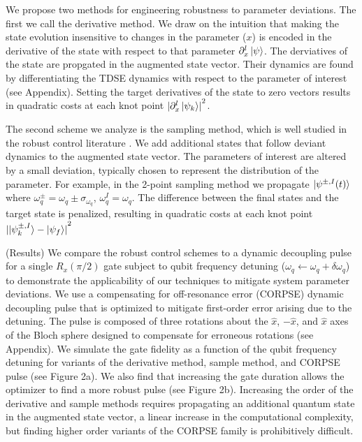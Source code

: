 \documentclass[
  amsfonts,
  amsmath,
  tbtags,
  amssymb,
  aps,
  nobibnotes,
  twocolumn,
]{revtex4-2}
\begin{document}
We propose two methods for engineering robustness
to parameter deviations. The first we call the
derivative method. We draw on the intuition that
making the state evolution insensitive to changes
in the parameter ($x$) is encoded in the derivative of
the state with respect to that parameter
$\partial_{x}^{l} \ket{\psi}$.
The derviatives of the state are propgated in the
augmented state vector. Their dynamics are found by differentiating
the TDSE dynamics with respect to the parameter of interest
(see Appendix). Setting the target derivatives of the state
to zero vectors results in quadratic costs at each
knot point
${\lvert \partial_{x}^{l} \ket{\psi_{k}} \rvert}^{2}$.

The second scheme we analyze is the sampling method,
which is well studied in the robust control literature
\cite{manchester2016derivative} \cite{tronarp2016sigma}.
We add additional
states that follow deviant dynamics to the augmented
state vector. The parameters of interest
are altered by a small deviation, typically chosen
to represent the distribution of the parameter.
For example, in the 2-point sampling method we
propagate $\ket{\psi^{\pm, I}(t)}$ where
$\omega_{q}^{\pm} = \omega_{q} \pm \sigma_{\omega_{q}}$,
$\omega_{q}^{I} = \omega_{q}$.
The difference between the final states and the target
state is penalized, resulting in quadratic costs at
each knot point
${\lvert \ket{\psi^{\pm, I}_{k}} - \ket{\psi_{f}} \rvert}^{2}$

(Results) We compare the robust control
schemes to a dynamic decoupling pulse
for a single $R_{x}(\pi/2)$ gate
subject to qubit frequency detuning
($\omega_{q} \gets \omega_{q} + \delta \omega_{q}$)
to demonstrate the applicability of our techniques to mitigate
system parameter deviations.
We use a compensating for off-resonance error
(CORPSE) dynamic decoupling pulse that is optimized
to mitigate first-order error arising due to the detuning.
The pulse is composed of
three rotations about the $\hat{x}$, $-\hat{x}$, and $\hat{x}$ axes
of the Bloch sphere
designed to compensate for erroneous rotations
(see Appendix). We simulate the gate fidelity as
a function of the qubit frequency detuning for
variants of the
derivative method, sample method, and
CORPSE pulse (see Figure 2a). We also find that
increasing the gate duration allows the optimizer
to find a more robust pulse
(see Figure 2b). Increasing the order of the derivative
and sample methods requires propagating an additional quantum state
in the augmented state vector, a linear increase
in the computational complexity, but finding higher order
variants of the CORPSE family is prohibitively difficult.
\end{document}
